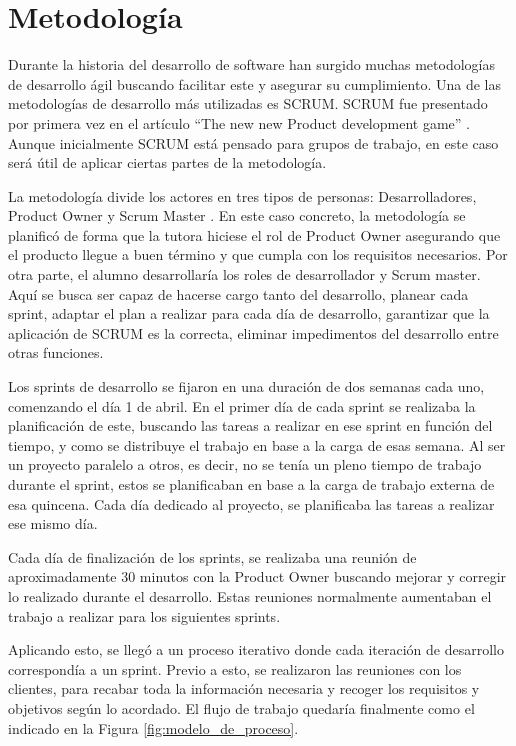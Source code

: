 \section{Metodología}

Durante la historia del desarrollo de software han surgido muchas metodologías de desarrollo ágil buscando facilitar este y asegurar su cumplimiento. Una de las metodologías de desarrollo más utilizadas es SCRUM. SCRUM fue presentado por primera vez en el artículo ``The new new Product development game'' \cite{takeuchi1986new}. Aunque inicialmente SCRUM está pensado para grupos de trabajo, en este caso será útil de aplicar ciertas partes de la metodología.

La metodología divide los actores en tres tipos de personas: Desarrolladores, Product Owner y Scrum Master \cite{schwaber2011scrum}. En este caso concreto, la metodología se planificó de forma que la tutora hiciese el rol de Product Owner asegurando que el producto llegue a buen término y que cumpla con los requisitos necesarios. Por otra parte, el alumno desarrollaría los roles de desarrollador y Scrum master. Aquí se busca ser capaz de hacerse cargo tanto del desarrollo, planear cada sprint, adaptar el plan a realizar para cada día de desarrollo, garantizar que la aplicación de SCRUM es la correcta, eliminar impedimentos del desarrollo entre otras funciones. 

Los sprints de desarrollo se fijaron en una duración de dos semanas cada uno, comenzando el día 1 de abril. En el primer día de cada sprint se realizaba la planificación de este, buscando las tareas a realizar en ese sprint en función del tiempo, y como se distribuye el trabajo en base a la carga de esas semana. Al ser un proyecto paralelo a otros, es decir, no se tenía un pleno tiempo de trabajo durante el sprint, estos se planificaban en base a la carga de trabajo externa de esa quincena. Cada día dedicado al proyecto, se planificaba las tareas a realizar ese mismo día. 

Cada día de finalización de los sprints, se realizaba una reunión de aproximadamente 30 minutos con la Product Owner buscando mejorar y corregir lo realizado durante el desarrollo. Estas reuniones normalmente aumentaban el trabajo a realizar para los siguientes sprints.

Aplicando esto, se llegó a un proceso iterativo donde cada iteración de desarrollo correspondía a un sprint. Previo a esto, se realizaron las reuniones con los clientes, para recabar toda la información necesaria y recoger los requisitos y objetivos según lo acordado. El flujo de trabajo quedaría finalmente como el indicado en la Figura \ref{fig:modelo_de_proceso}.

